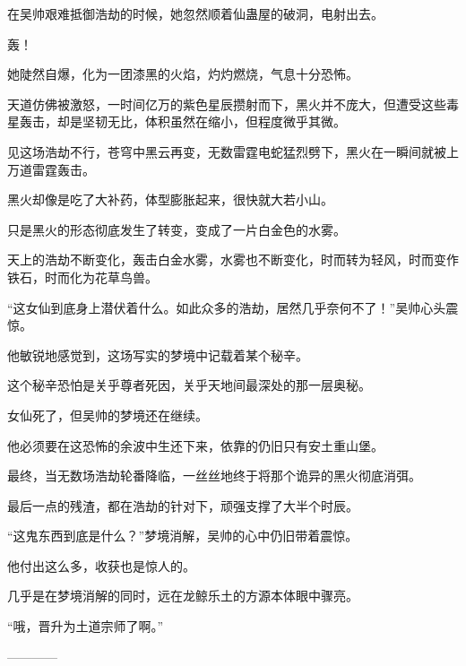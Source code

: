 \begin{this_body}
在吴帅艰难抵御浩劫的时候，她忽然顺着仙蛊屋的破洞，电射出去。

轰！

她陡然自爆，化为一团漆黑的火焰，灼灼燃烧，气息十分恐怖。

天道仿佛被激怒，一时间亿万的紫色星辰攒射而下，黑火并不庞大，但遭受这些毒星轰击，却是坚韧无比，体积虽然在缩小，但程度微乎其微。

见这场浩劫不行，苍穹中黑云再变，无数雷霆电蛇猛烈劈下，黑火在一瞬间就被上万道雷霆轰击。

黑火却像是吃了大补药，体型膨胀起来，很快就大若小山。

只是黑火的形态彻底发生了转变，变成了一片白金色的水雾。

天上的浩劫不断变化，轰击白金水雾，水雾也不断变化，时而转为轻风，时而变作铁石，时而化为花草鸟兽。

“这女仙到底身上潜伏着什么。如此众多的浩劫，居然几乎奈何不了！”吴帅心头震惊。

他敏锐地感觉到，这场写实的梦境中记载着某个秘辛。

这个秘辛恐怕是关乎尊者死因，关乎天地间最深处的那一层奥秘。

女仙死了，但吴帅的梦境还在继续。

他必须要在这恐怖的余波中生还下来，依靠的仍旧只有安土重山堡。

最终，当无数场浩劫轮番降临，一丝丝地终于将那个诡异的黑火彻底消弭。

最后一点的残渣，都在浩劫的针对下，顽强支撑了大半个时辰。

“这鬼东西到底是什么？”梦境消解，吴帅的心中仍旧带着震惊。

他付出这么多，收获也是惊人的。

几乎是在梦境消解的同时，远在龙鲸乐土的方源本体眼中骤亮。

“哦，晋升为土道宗师了啊。”

------------

\end{this_body}

